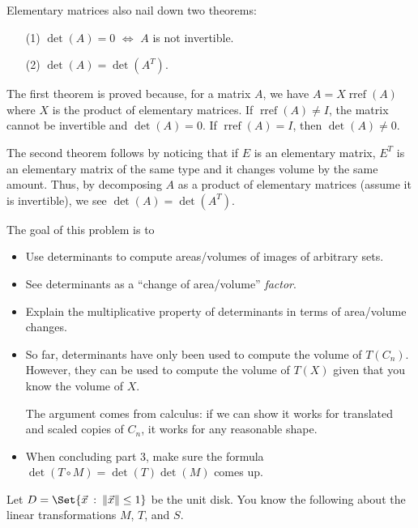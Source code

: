 \documentclass{problemset}
\DeclareMathOperator{\Rref}{rref}
\providecommand\given{}
\newcommand\SetSymbol[1][]{%
	\nonscript\::%
	\allowbreak
	\nonscript\:
	\mathopen{}}
\renewcommand\given{\SetSymbol[\delimsize]}
\begin{document}
\begin{lesson}
	Elementary matrices also nail down two theorems:
	\begin{enumerate}
		\item[(1)] $\det(A) = 0$ $\iff$ $A$ is not invertible.
		\item[(2)] $\det(A)=\det(A^T)$.
	\end{enumerate}

	The first theorem is proved because, for a matrix $A$, we have $A=X\!\Rref(A)$ where $X$ is the product of elementary matrices.
	If $\Rref(A)\neq I$, the matrix cannot be invertible and $\det(A)=0$. If $\Rref(A)=I$, then $\det(A)\neq 0$.

	The second theorem follows by noticing that if $E$ is an elementary matrix, $E^T$ is an elementary matrix 
	of the same type and it changes volume by the same amount. Thus, by decomposing $A$ as a product of elementary
	matrices (assume it is invertible), we see $\det(A)=\det(A^T)$.

\end{lesson}
	\question
	\begin{annotation}
		\begin{goals}

			The goal of this problem is to
			\begin{itemize}
				\item Use determinants to compute areas/volumes of images of
					arbitrary sets.
				\item See determinants as a ``change of area/volume'' \emph{factor}.
				\item Explain the multiplicative property of determinants in
					terms of area/volume changes.
			\end{itemize}
		\end{goals}

		\begin{notes}
			\begin{itemize}
				\item So far, determinants have only been used to compute
					the volume of $T(C_n)$. However, they can be used to compute
					the volume of $T(X)$ given that you know the volume of $X$.

					The argument comes from calculus: if we can show it works
					for translated and scaled copies of $C_n$, it works for any 
					reasonable shape.
				\item When concluding part 3, make sure the formula $\det(T\circ M)=
					\det(T)\det(M)$ comes up.
			\end{itemize}
		\end{notes}
	\end{annotation}
	Let $D=\Set{\vec x \given \|\vec x\|\leq 1}$ be the unit disk. You know the
	following about the linear transformations $M$, $T$, and $S$. 
	
\end{document}
